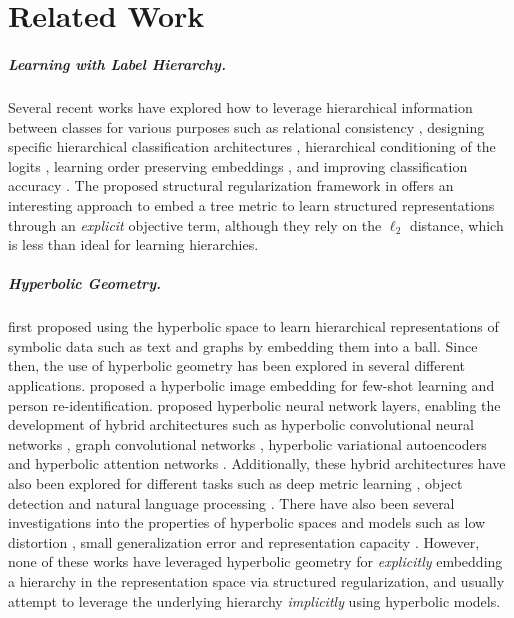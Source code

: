 \section{Related Work}
\label{sec:related}

\subparagraph{Learning with Label Hierarchy.} Several recent works have explored how to leverage hierarchical information between classes for various purposes such as relational consistency 
 \citep{DengHEX}, designing specific hierarchical classification architectures \citep{HDCNN,guoCNNRNN, noor2022capsule}, hierarchical conditioning of the logits \citep{davis2021hierarchical}, learning order preserving embeddings \citep{dhall2020hierarchical}, and improving classification accuracy \citep{iclr16CL, taherkhani2019weakly, lei2017weakly, semantivisualHierarchy, ZHENG201797, hoffmann2022ranking}. The proposed structural regularization framework in \citep{zeng2022learning} offers an interesting approach to embed a tree metric to learn structured representations through an \emph{explicit} objective term, although they rely on the $\ell_2$ distance, which is less than ideal for learning hierarchies. 
 
\subparagraph{Hyperbolic Geometry.}
\citep{nickel2017poincare} first proposed using the hyperbolic space to learn hierarchical representations of symbolic data such as text and graphs by embedding them into a \Poincare ball. Since then, the use of hyperbolic geometry has been explored in several different applications. \citet{khrulkov2020hyperbolic} proposed a hyperbolic image embedding for few-shot learning and person re-identification. \citep{ganea2018hyperbolic} proposed hyperbolic neural network layers, enabling the development of hybrid architectures such as hyperbolic convolutional neural networks \citep{shimizu2020hyperbolic}, graph convolutional networks \citep{dai2021hyperbolic}, hyperbolic variational autoencoders \citep{mathieu2019continuous} and hyperbolic attention networks \citep{gulcehre2018hyperbolic}. Additionally, these hybrid architectures have also been explored for different tasks such as deep metric learning \citep{ermolov2022hyperbolic, yan2021unsupervised}, object detection \citep{lang2022hyperbolic} and natural language processing \citep{dhingra2018embedding}. There have also been several investigations into the properties of hyperbolic spaces and models such as low distortion \citep{Sarkar_2012}, small generalization error \citep{suzuki2021generalization} and representation capacity \citep{mishne2023numerical}. However, none of these works have leveraged  hyperbolic geometry for \emph{explicitly} embedding a hierarchy in the representation space via structured regularization, and usually attempt to leverage the underlying hierarchy \emph{implicitly} using hyperbolic models. 